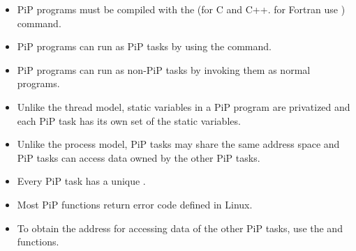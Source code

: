 \begin{itemize}
\item PiP programs must be compiled with the  
  (for C and C++. for Fortran use ) command.
\item PiP programs can run as PiP tasks by using the
   command. 
\item PiP programs can run as non-PiP tasks by invoking them as normal
  programs.
\item Unlike the thread model, static variables in a PiP program are
  privatized and each PiP task has its own set of the static
  variables.
\item Unlike the process model, PiP tasks may share the same address
  space and PiP tasks can access data owned by the other PiP tasks.
\item Every PiP task has a unique {\PIPID}.
\item Most PiP functions return error code defined in Linux.
\item To obtain the address for accessing data of the other PiP tasks,
  use the  and
   functions.  
\end{itemize}

